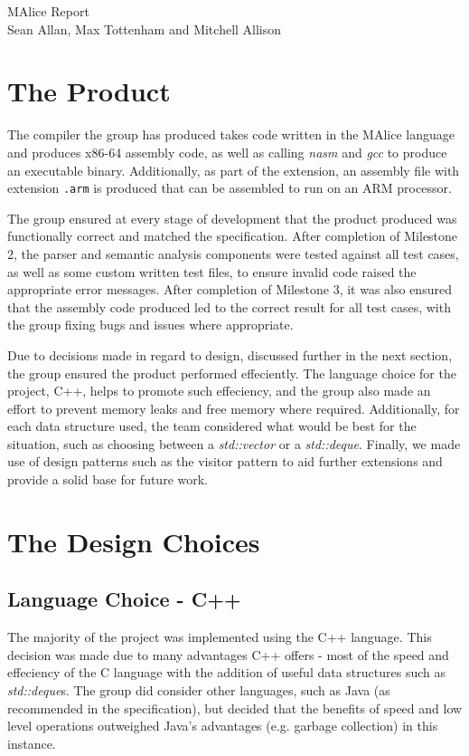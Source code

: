 \documentclass[a4wide, 11pt]{article}
\begin{document}
\begin{center}
{\huge MAlice Report} \\ [0.4cm]
{\large Sean Allan, Max Tottenham and Mitchell Allison} \\ [0.2cm]
\vspace{1cm}
\end{center}

\section{The Product}
The compiler the group has produced takes code written in the MAlice language
and produces x86-64 assembly code, as well as calling \emph{nasm} and \emph{gcc}
to produce an executable binary. Additionally, as part of the extension, an
assembly file with extension \texttt{.arm} is produced that can be assembled
to run on an ARM processor.

The group ensured at every stage of development that the product produced
was functionally correct and matched the specification. After completion of
Milestone 2, the parser and semantic analysis components were tested against
all test cases, as well as some custom written test files, to ensure invalid
code raised the appropriate error messages. After completion of Milestone 3, it
was also ensured that the assembly code produced led to the correct result 
for all test cases, with the group fixing bugs and issues where appropriate.

Due to decisions made in regard to design, discussed further in the next
section, the group ensured the product performed effeciently. The language
choice for the project, C++, helps to promote such effeciency, and the group
also made an effort to prevent memory leaks and free memory where required. 
Additionally, for each data structure used, the team considered what would be
best for the situation, such as choosing between a \emph{std::vector} or a
\emph{std::deque}. Finally, we made use of design patterns such as the visitor
pattern to aid further extensions and provide a solid base for future work.

\section{The Design Choices}

\subsection{Language Choice - C++}
The majority of the project was implemented using the C++ language. This
decision was made due to many advantages C++ offers - most of the speed and
effeciency of the C language with the addition of useful data structures such
as \emph{std::deque}s. The group did consider other languages, such as Java (as
recommended in the specification), but decided that the benefits of speed and
low level operations outweighed Java's advantages (e.g. garbage collection) in
this instance.
\end{document}
